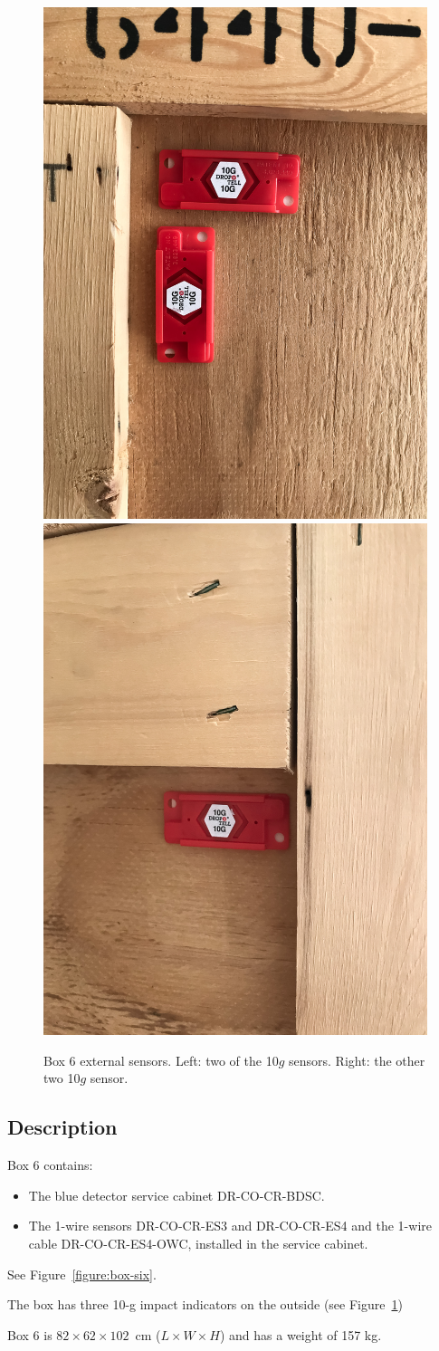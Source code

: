 \documentclass{article}
\begin{document}
\begin{figure}[bp]
\begin{center}
\includegraphics[width=0.3\linewidth]{figures/20210106T120810.jpg}
\includegraphics[width=0.3\linewidth]{figures/20210106T120814.jpg}
\end{center}
\caption{Box 6 external sensors. Left: two of the 10$g$ sensors. Right: the other two 10$g$ sensor.}
\label{figure:box-six-external-sensors}
\end{figure}

\subsection{Description}

Box 6 contains:

\begin{itemize}
    \item The blue detector service cabinet DR-CO-CR-BDSC.
    \item The 1-wire sensors  DR-CO-CR-ES3 and DR-CO-CR-ES4 and the 1-wire cable DR-CO-CR-ES4-OWC, installed in the service cabinet.
\end{itemize}

See Figure~\ref{figure:box-six}.

The box has three 10-g impact indicators on the outside (see Figure~\ref{figure:box-six-external-sensors})

Box 6 is  $82 \times 62 \times 102$~cm ($L \times W \times H$) and has a weight of 157 kg.
\end{document}
